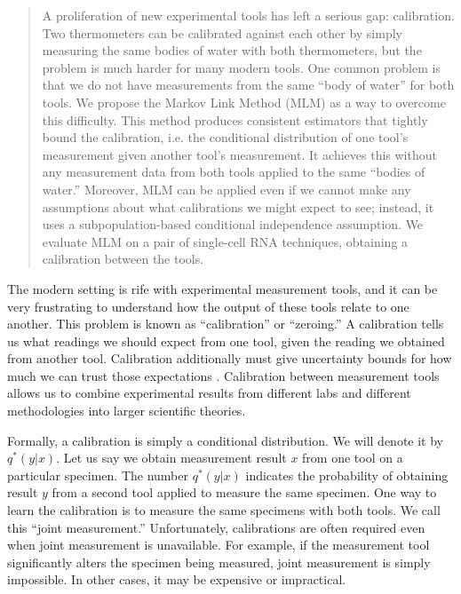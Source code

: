 \usepackage{amsthm}
\newtheorem{thm}{Theorem}
\newtheorem{lem}{Lemma}
\newtheorem{conj}{Conjecture}

\theoremstyle{definition}
\newtheorem{example}{Example}
\newtheorem{definition}{Definition}


\maketitle

\begin{abstract}
A proliferation of new experimental tools has left a serious gap: calibration. Two thermometers can be calibrated against each other by simply measuring the same bodies of water with both thermometers, but the problem is much harder for many modern tools.  One common problem is that we do not have measurements from the same ``body of water'' for both tools.  We propose the Markov Link Method (MLM) as a way to overcome this difficulty.   This method produces consistent estimators that tightly bound the calibration, i.e. the conditional distribution of one tool's measurement given another tool's measurement. It achieves this without any measurement data from both tools applied to the same ``bodies of water.'' Moreover, MLM can be applied even if we cannot make any assumptions about what calibrations we might expect to see; instead, it uses a subpopulation-based conditional independence assumption.   We evaluate MLM on a pair of single-cell RNA techniques, obtaining a calibration between the tools.
\end{abstract}

The modern setting is rife with experimental measurement tools, and it can be very frustrating to understand how the output of these tools relate to one another.  This problem is known as ``calibration'' or ``zeroing.''  A calibration tells us what readings we should expect from one tool, given the reading we obtained from another tool.   Calibration additionally must give uncertainty bounds for how much we can trust those expectations  \cite{bipm2008international}.  Calibration between measurement tools allows us to combine experimental results from different labs and different methodologies into larger scientific theories.  

Formally, a calibration is simply a conditional distribution.  We will denote it by $q^*(y|x)$.  Let us say we obtain measurement result $x$ from one tool on a particular specimen.  The number $q^*(y|x)$ indicates the probability of obtaining result $y$ from a second tool applied to measure the same specimen.  One way to learn the calibration is to measure the same specimens with both tools.  We call this ``joint measurement.''  Unfortunately, calibrations are often required even when joint measurement is unavailable.  For example, if the measurement tool significantly alters the specimen being measured, joint measurement is simply impossible.  In other cases, it may be expensive or impractical.

